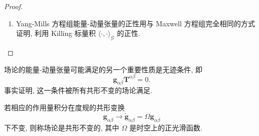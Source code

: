 \begin{proof}
\begin{enumerate}
\textbf{习题.} 验证公式 \eqref{eq:c1-65}. 

我们在每点 $p \in \mathbf{M}$ 处引入 $F$ 的如下：
\[
\begin{aligned}
\alpha_A &= F_{A4}, \qquad \underline{\alpha}_A = F_{A3}\\
\rho &= \frac{1}{2}F_{34}, \qquad \sigma = \frac{1}{2}\, {}^\star F_{34}.
\end{aligned}
\]
它完全确定了张量 F. 这里指标 $A = 1, 2$ 对应于与球面相切的 $E_1, E_2$ 方向, 而指标 3, 4 对应于 $E_3 = \underline{L}$ 与 $E_4 = L$. 然后我们对 ${}^\star F$ 计算得：
\[
\begin{aligned}
{}^\star F_{A4} &= -{}^\star\alpha_A, \qquad {}^\star F_{A3} = {}^\star\underline{\alpha}_A\\
{}^\star F_{34} &= 2\sigma, \qquad {}^{\star\star}F_{34} = -2\rho
\end{aligned}
\]
其中 ${}^\star\alpha_A = \epsilon_{AB}\alpha_B$. 这里 $\epsilon_{AB}$ 是单位球面上的体积形式, 故 $\epsilon_{AB} = \textstyle\frac{1}{2}\epsilon_{AB34}$, 即 $\epsilon_{11} = \epsilon_{22} = 0$, $\epsilon_{12} = -\epsilon_{21} = 1$. 用这一记号, 我们计算得：
\[
\begin{aligned}
T(E_{(4)}, E_{(4)}) &= \frac{1}{2}\sum_{A=1}^2\left(F_{4A}\cdot F_{4A} + {}^\star F_{4A}\cdot{}^\star F_{4A}\right)\\
&= \frac{1}{2}\sum_{A=1}^2\left(\alpha_A\cdot\alpha_A + {}^\star\alpha_A\cdot{}^\star\alpha_A\right)\\
&= \sum_{A=1}^2\alpha_A\cdot\alpha_A = |\alpha|^2 \geq 0.
\end{aligned}
\]
类似地, 
\[
T(E_{(3)}, E_{(3)}) = \sum_{A=1}^2\underline{\alpha}_A\cdot\underline{\alpha}_A = |\underline{\alpha}|^2 \geq 0
\]
用同样的方法我们得到
\[
T(E, \underline{E}) = \rho^2 + \sigma^2 \geq 0
\]
这就证明了我们的断言. 
\item Yang-Mills 方程组能量-动量张量的正性用与 Maxwell 方程组完全相同的方式证明, 利用 Killing 标量积 $\langle\cdot, \cdot\rangle_{\mathcal{G}}$ 的正性. 
\end{enumerate}
\end{proof}

场论的能量-动量张量可能满足的另一个重要性质是无迹条件, 即
\[
\mathbf{g}_{\alpha\beta}\mathbf{T}^{\alpha\beta} = 0.
\]
事实证明, 这一条件被所有共形不变的场论满足. 

\begin{definition*}
若相应的作用量积分在度规的共形变换
\[
\mathbf{g}_{\alpha\beta} \longrightarrow \tilde{\mathbf{g}}_{\alpha\beta} = \Omega\mathbf{g}_{\alpha\beta}
\]
下不变, 则称场论是共形不变的, 其中 $\Omega$ 是时空上的正光滑函数. 
\end{definition*}

